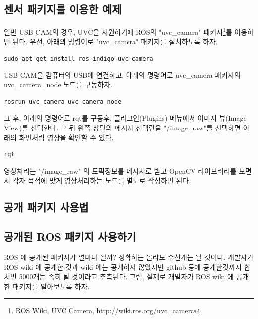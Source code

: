 \subsection{센서 패키지를 이용한 예제}

일반 USB CAM의 경우, UVC을 지원하기에 ROS의 "uvc\_camera" 패키지\footnote{ROS Wiki, UVC Camera, http://wiki.ros.org/uvc\_camera}를 이용하면 된다. 우선, 아래의 명령어로 "uvc\_camera" 패키지를 설치하도록 하자.

\begin{lstlisting}[language=ROS]
sudo apt-get install ros-indigo-uvc-camera 
\end{lstlisting}

USB CAM을 컴퓨터의 USB에 연결하고, 아래의 명령어로 uvc\_camera 패키지의 uvc\_camera\_node 노드를 구동하자.

\begin{lstlisting}[language=ROS]
rosrun uvc_camera uvc_camera_node
\end{lstlisting}

그 후, 아래의 명령어로 rqt를 구동후, 플러그인(Plugins) 메뉴에서 이미지 뷰(Image View)를 선택한다. 그 뒤 왼쪽 상단의 메시지 선택란을 "/image\_raw"를 선택하면 아래의 화면처럼 영상을 확인할 수 있다. 

\begin{lstlisting}[language=ROS]
rqt
\end{lstlisting}

영상처리는 "/image\_raw" 의 토픽정보를 메시지로 받고 OpenCV 라이브러리를 보면서 각자 목적에 맞게 영상처리하는 노드를 별도로 작성하면 된다.

\subsection{공개 패키지 사용법}

\subsection{공개된 ROS 패키지 사용하기}

ROS 에 공개된 패키지가 얼마나 될까? 정확히는 몰라도 수천개는 될 것이다. 개발자가 ROS wiki 에 공개한 것과 wiki 에는 공개하지 않았지만 github 등에 공개한것까지 합치면 5000개는 족히 될 것이라고 추측된다. 그럼, 실제로 개발자가 ROS wiki 에 공개한 패키지를 알아보도록 하자.


